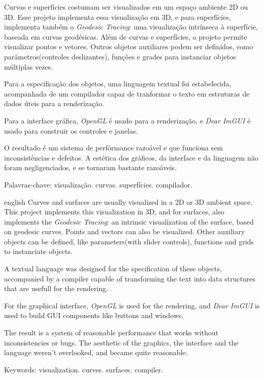 \setlength{\absparsep}{18pt} 
\begin{resumo}[Resumo]
Curvas e superfícies costumam ser visualizados em um espaço ambiente 2D ou 3D.
Esse projeto implementa essa visualização em 3D, e para superfícies,
implementa também o \textit{Geodesic Tracing}: uma visualização intrínseca à
superfície, baseada em curvas geodésicas. Além de curvas e superfícies,
o projeto permite visualizar pontos e vetores. Outros objetos auxiliares podem ser
definidos, como parâmetros(controles deslizantes), funções e grades para
instanciar objetos múltiplas vezes.

Para a especificação dos objetos, uma linguagem textual foi estabelecida,
acompanhada de um compilador capaz de tranformar o texto em estruturas de dados
úteis para a renderização.

Para a interface gráfica, \textit{OpenGL} é usado para a renderização,
e \textit{Dear ImGUI} é usado para construir os controles e janelas.

O resultado é um sistema de perfórmance razoável e que funciona sem
inconsistências e defeitos. A estética dos gráficos, da interface e da
linguagem não foram negligenciados, e se tornaram bastante razoáveis.

 Palavras-chave: visualização. curvas. superfícies. compilador.
\end{resumo}

\begin{resumo}[Abstract]
\begin{otherlanguage*}{english}
Curves and surfaces are usually visualized in a 2D or 3D ambient space.
This project implements this visualization in 3D, and for surfaces, also
implements the \textit{Geodesic Tracing}: an intrinsic visualization of the surface,
based on geodesic curves. Points and vectors can also be visualized.
Other auxiliary objects can be defined, like parameters(with slider controls),
functions and grids to instanciate objects.

A textual language was designed for the specification of these objects,
accompanied by a compiler capable of transforming the text into data structures
that are usefull for the rendering.

For the graphical interface, \textit{OpenGL} is used for the rendering,
and \textit{Dear ImGUI} is used to build GUI components like buttons and windows.

The result is a system of reasonable performance that works without inconsistencies
or bugs. The aesthetic of the graphics, the interface and the language weren't
overlooked, and became quite reasonable.

 Keywords: visualization. curves. surfaces. compiler.
\end{otherlanguage*}
\end{resumo}